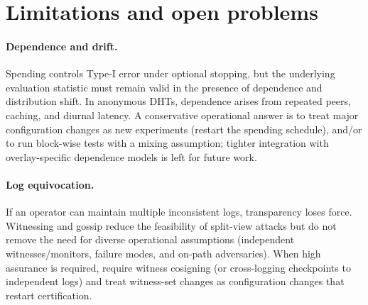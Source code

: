 \documentclass[11pt]{article}
\begin{document}
\section{Limitations and open problems}
\paragraph{Dependence and drift.}
Spending controls Type-I error under optional stopping, but the underlying evaluation statistic must remain valid in the presence of dependence and distribution shift.
In anonymous DHTs, dependence arises from repeated peers, caching, and diurnal latency.
A conservative operational answer is to treat major configuration changes as new experiments (restart the spending schedule),
and/or to run block-wise tests with a mixing assumption; tighter integration with overlay-specific dependence models is left for future work.

\paragraph{Log equivocation.}
If an operator can maintain multiple inconsistent logs, transparency loses force.
Witnessing and gossip reduce the feasibility of split-view attacks but do not remove the need for diverse operational assumptions (independent witnesses/monitors, failure modes, and on-path adversaries).
When high assurance is required, require witness cosigning (or cross-logging checkpoints to independent logs) and treat witness-set changes as configuration changes that restart certification.



\end{document}
